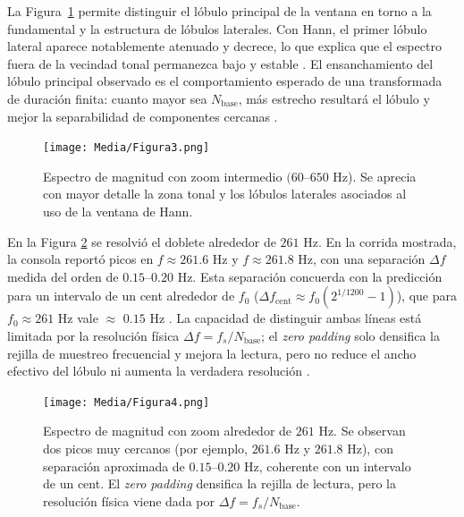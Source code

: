 \documentclass[letter,12pt]{article}
\begin{document}
La Figura~\ref{fig:exp1-mag-mid} permite distinguir el lóbulo principal de la ventana en torno a la fundamental y la estructura de lóbulos laterales. Con Hann, el primer lóbulo lateral aparece notablemente atenuado y decrece, lo que explica que el espectro fuera de la vecindad tonal permanezca bajo y estable \cite{Harris1978Windows}. El ensanchamiento del lóbulo principal observado es el comportamiento esperado de una transformada de duración finita: cuanto mayor sea \(N_{\text{base}}\), más estrecho resultará el lóbulo y mejor la separabilidad de componentes cercanas \cite{OppenheimSchaferDTSP3e}. 
\begin{figure}[H]
  \centering
  \texttt{[image: Media/Figura3.png]}
  \caption{Espectro de magnitud con zoom intermedio \((60\)–\(650\) Hz). Se aprecia con mayor detalle la zona tonal y los lóbulos laterales asociados al uso de la ventana de Hann.}
  \label{fig:exp1-mag-mid}
\end{figure}

En la Figura \ref{fig:exp1-mag-zoom} se resolvió el doblete alrededor de \(261\) Hz. En la corrida mostrada, la consola reportó picos en \(f\approx 261.6\) Hz y \(f\approx 261.8\) Hz, con una separación \(\Delta f\) medida del orden de \(0.15\)–\(0.20\) Hz. Esta separación concuerda con la predicción para un intervalo de un cent alrededor de \(f_0\) (\(\Delta f_{\text{cent}} \approx f_0(2^{1/1200}-1)\)), que para \(f_0\approx 261\) Hz vale $\approx$ \(0.15\) Hz \cite{OsgoodFTAMS2019}. La capacidad de distinguir ambas líneas está limitada por la resolución física \(\Delta f=f_s/N_{\text{base}}\); el \emph{zero padding} solo densifica la rejilla de muestreo frecuencial y mejora la lectura, pero no reduce el ancho efectivo del lóbulo ni aumenta la verdadera resolución \cite{OppenheimSchaferDTSP3e,Harris1978Windows}.

\begin{figure}[H]
  \centering
  \texttt{[image: Media/Figura4.png]}
  \caption{Espectro de magnitud con zoom alrededor de \(261\) Hz. Se observan dos picos muy cercanos (por ejemplo, \(261.6\) Hz y \(261.8\) Hz), con separación aproximada de \(0.15\)–\(0.20\) Hz, coherente con un intervalo de un cent. El \emph{zero padding} densifica la rejilla de lectura, pero la resolución física viene dada por \(\Delta f=f_s/N_{\text{base}}\).}
  \label{fig:exp1-mag-zoom}
\end{figure}
\end{document}

